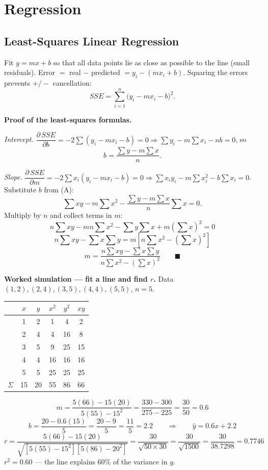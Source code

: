 \section{Regression}

\subsection{Least-Squares Linear Regression}

\begin{defbox}
Fit $y=mx+b$ so that all data points lie as close as possible to the line (small residuals). Error $=$ real $-$ predicted $= y_i-(mx_i+b)$. Squaring the errors prevents $+/-$ cancellation:
\[
SSE = \sum_{i=1}^n \big(y_i - mx_i - b\big)^2.
\]
\end{defbox}

\begin{examplebox}
\textbf{Proof of the least-squares formulas.}

\emph{Intercept.} $\dfrac{\partial\,SSE}{\partial b} = -2\sum(y_i-mx_i-b) = 0 \Rightarrow \sum y_i - m\sum x_i - nb = 0$, so
\[
b = \frac{\sum y - m\sum x}{n}. \tag{A}
\]

\emph{Slope.} $\dfrac{\partial\,SSE}{\partial m} = -2\sum x_i(y_i-mx_i-b) = 0 \Rightarrow \sum x_iy_i - m\sum x_i^2 - b\sum x_i = 0$. Substitute $b$ from (A):
\[
\sum xy - m\sum x^2 - \frac{\sum y - m\sum x}{n}\sum x = 0.
\]
Multiply by $n$ and collect terms in $m$:
\[
n\sum xy - mn\sum x^2 - \sum y\sum x + m\left(\sum x\right)^2 = 0
\]
\[
n\sum xy - \sum x\sum y = m\left[n\sum x^2 - \left(\sum x\right)^2\right]
\]
\[
\boxed{m = \dfrac{n\sum xy - \sum x\sum y}{n\sum x^2 - (\sum x)^2}} \qquad\blacksquare
\]
\end{examplebox}

\begin{examplebox}
\textbf{Worked simulation — fit a line and find $r$.} Data $(1,2),(2,4),(3,5),(4,4),(5,5)$, $n=5$.

\begin{center}
\begin{tabular}{@{}cccccc@{}}
\toprule
 & $x$ & $y$ & $x^2$ & $y^2$ & $xy$ \\
\midrule
& 1 & 2 & 1 & 4 & 2\\
& 2 & 4 & 4 & 16 & 8\\
& 3 & 5 & 9 & 25 & 15\\
& 4 & 4 & 16 & 16 & 16\\
& 5 & 5 & 25 & 25 & 25\\
\midrule
$\Sigma$ & 15 & 20 & 55 & 86 & 66\\
\bottomrule
\end{tabular}
\end{center}
\[
m = \frac{5(66)-15(20)}{5(55)-15^2} = \frac{330-300}{275-225} = \frac{30}{50} = 0.6
\]
\[
b = \frac{20-0.6(15)}{5} = \frac{20-9}{5} = \frac{11}{5} = 2.2 \qquad\Rightarrow\qquad \hat y = 0.6x+2.2
\]
\[
r = \frac{5(66)-15(20)}{\sqrt{[5(55)-15^2][5(86)-20^2]}} = \frac{30}{\sqrt{50\times 30}} = \frac{30}{\sqrt{1500}} = \frac{30}{38.7298}=0.7746
\]
$r^2 = 0.60$ — the line explains 60\% of the variance in $y$.
\end{examplebox}

